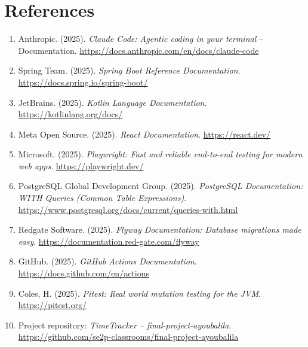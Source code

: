 \documentclass[11pt,a4paper]{article}
\newcommand{\repourl}{https://github.com/se2p-classrooms/final-project-ayoubalila}
\begin{document}
\newpage
\section{References}

\begin{enumerate}
    \item Anthropic. (2025). \textit{Claude Code: Agentic coding in your terminal} -- Documentation. \url{https://docs.anthropic.com/en/docs/claude-code}
    \item Spring Team. (2025). \textit{Spring Boot Reference Documentation}. \url{https://docs.spring.io/spring-boot/}
    \item JetBrains. (2025). \textit{Kotlin Language Documentation}. \url{https://kotlinlang.org/docs/}
    \item Meta Open Source. (2025). \textit{React Documentation}. \url{https://react.dev/}
    \item Microsoft. (2025). \textit{Playwright: Fast and reliable end-to-end testing for modern web apps}. \url{https://playwright.dev/}
    \item PostgreSQL Global Development Group. (2025). \textit{PostgreSQL Documentation: WITH Queries (Common Table Expressions)}. \url{https://www.postgresql.org/docs/current/queries-with.html}
    \item Redgate Software. (2025). \textit{Flyway Documentation: Database migrations made easy}. \url{https://documentation.red-gate.com/flyway}
    \item GitHub. (2025). \textit{GitHub Actions Documentation}. \url{https://docs.github.com/en/actions}
    \item Coles, H. (2025). \textit{Pitest: Real world mutation testing for the JVM}. \url{https://pitest.org/}
    \item Project repository: \textit{TimeTracker -- final-project-ayoubalila}. \url{\repourl}
\end{enumerate}
\end{document}
